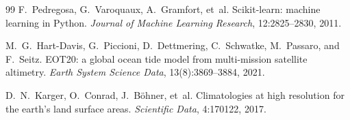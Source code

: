 \begin{thebibliography}{99}
F.~Pedregosa, G.~Varoquaux, A.~Gramfort, et~al.
\newblock Scikit-learn: machine learning in Python.
\newblock \emph{Journal of Machine Learning Research}, 12:2825--2830, 2011.

M.~G.~Hart-Davis, G.~Piccioni, D.~Dettmering, C.~Schwatke, M.~Passaro, and F.~Seitz.
\newblock EOT20: a global ocean tide model from multi-mission satellite altimetry.
\newblock \emph{Earth System Science Data}, 13(8):3869--3884, 2021.

D.~N.~Karger, O.~Conrad, J.~B\"ohner, et~al.
\newblock Climatologies at high resolution for the earth's land surface areas.
\newblock \emph{Scientific Data}, 4:170122, 2017.

\end{thebibliography}

